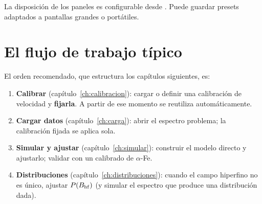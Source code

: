 
\begin{truco}
La disposición de los paneles es configurable desde
. Puede guardar presets adaptados a
pantallas grandes o portátiles.
\end{truco}

\section{El flujo de trabajo típico}

El orden recomendado, que estructura los capítulos siguientes, es:

\begin{enumerate}[nosep]
  \item \textbf{Calibrar} (capítulo~\ref{ch:calibracion}): cargar o definir una
        calibración de velocidad y \textbf{fijarla}. A partir de ese momento se
        reutiliza automáticamente.
  \item \textbf{Cargar datos} (capítulo~\ref{ch:carga}): abrir el espectro
        problema; la calibración fijada se aplica sola.
  \item \textbf{Simular y ajustar} (capítulo~\ref{ch:simular}): construir el
        modelo directo y ajustarlo; validar con un calibrado de $\alpha$-Fe.
  \item \textbf{Distribuciones} (capítulo~\ref{ch:distribuciones}): cuando el
        campo hiperfino no es único, ajustar $P(B_{\mathrm{hf}})$ (y simular el espectro que
        produce una distribución dada).
\end{enumerate}
